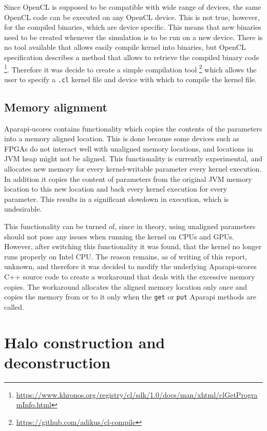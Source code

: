 \documentclass{l4proj}
\begin{document}
Since OpenCL is supposed to be compatible with wide range of devices, the same OpenCL
code can be executed on any OpenCL device. This is not true, however, for the 
compiled binaries, which are device specific. This means that new binaries need to 
be created whenever the simulation is to be run on a new device. There is no
tool available that allows easily compile kernel into binaries, but OpenCL specification
describes a method that allows to retrieve the compiled binary code
\footnote{\url{https://www.khronos.org/registry/cl/sdk/1.0/docs/man/xhtml/clGetProgramInfo.html}}.
Therefore it was decide to create a simple compilation tool 
\footnote{\url{https://github.com/adikus/cl-compile}}
which allows the user to specify a \texttt{.cl} kernel file and device with which to
compile the kernel file.

\subsection{Memory alignment}

Aparapi-ucores contains functionality which copies the contents of the parameters
into a memory aligned location. This is done because some devices such as FPGAs
do not interact well with unaligned memory locations, and locations in JVM heap
might not be aligned. This functionality is currently experimental, and allocates 
new memory for every kernel-writable parameter every kernel execution. In addition
it copies the content of parameters from the original JVM memory location to this new 
location and back every kernel execution for every parameter. This results in a significant 
slowdown in execution, which is undesirable.

This functionality can be turned of, since in theory, using unaligned parameters
should not pose any issues when running the kernel on CPUs and GPUs. However,
after switching this functionality it was found, that the kernel no longer runs
properly on Intel CPU. The reason remains, as of writing of this report, unknown,
and therefore it was decided to modify the underlying Aparapi-ucores C++ source code
to create a workaround that deals with the excessive memory copies. The workaround
allocates the aligned memory location only once and copies the memory from or to it
only when the \texttt{get} or \texttt{put} Aparapi methods are called.

\section{Halo construction and deconstruction}
\end{document}
